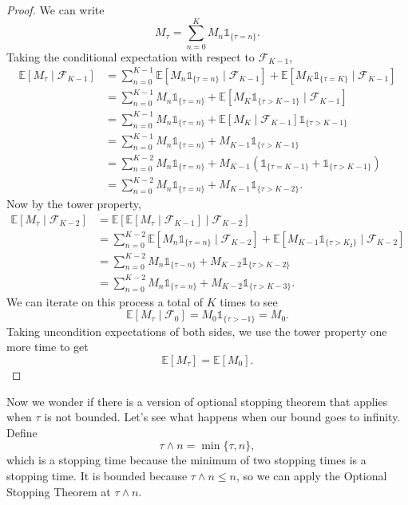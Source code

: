 \documentclass{tufte-handout}
\newcommand*\E{\mathbb{E}}
\theoremstyle{definition}
\begin{document}
\begin{proof}
	We can write \[
		M_\tau = \sum\limits_{n=0}^{K} M_n \mathds{1}_{\{\tau=n\}}
	.\] Taking the conditional expectation with respect to $\mathscr{F}_{K-1}$,
	\begin{align*}
		\E\left[M_\tau \mid \mathscr{F}_{K-1}\right] &= \sum\limits_{n=0}^{K-1} \E\left[M_n \mathds{1}_{\{\tau = n\}} \mid \mathscr{F}_{K-1}\right] + \E\left[M_K \mathds{1}_{\{\tau = K\}} \mid \mathscr{F}_{K-1}\right]  \\
		&= \sum\limits_{n=0}^{K-1} M_n \mathds{1}_{\{\tau=n\}} + \E\left[M_K \mathds{1}_{\{\tau > K-1\}} \mid \mathscr{F}_{K-1}\right]  \\
		&= \sum\limits_{n=0}^{K-1} M_n \mathds{1}_{\{\tau=n\}} + \E\left[M_K \mid \mathscr{F}_{K-1}\right] \mathds{1}_{\{\tau > K-1\}} \\
		&= \sum\limits_{n=0}^{K-1} M_n \mathds{1}_{\{\tau=n\}} + M_{K-1} \mathds{1}_{\{\tau > K-1\}} \\
		&= \sum\limits_{n=0}^{K-2}  M_n \mathds{1}_{\{\tau = n\}} + M_{K-1} \left( \mathds{1}_{\{\tau = K-1\}} + \mathds{1}_{\{\tau > K-1\}} \right) \\
		&= \sum\limits_{n=0}^{K-2} M_n \mathds{1}_{\{\tau = n\}} + M_{K-1} \mathds{1}_{\{\tau > K-2\}}
	.\end{align*}
	Now by the tower property,
	\begin{align*}
		\E\left[M_\tau \mid \mathscr{F}_{K-2}\right] &= \E\left[\E\left[M_\tau \mid \mathscr{F}_{K-1}\right] \mid \mathscr{F}_{K-2}\right]  \\
													 &= \sum\limits_{n=0}^{K-2} \E\left[M_n \mathds{1}_{\{\tau = n\}} \mid \mathscr{F}_{K-2}\right] + \E\left[M_{K-1}  \mathds{1}_{\{\tau > K_2\}} \mid \mathscr{F}_{K-2} \right] \\
													 &= \sum\limits_{n=0}^{K-2} M_n \mathds{1}_{\{\tau - n\}} + M_{K-2}\mathds{1}_{\{\tau > K-2\}} \\
													 &= \sum\limits_{n=0}^{K-2} M_n \mathds{1}_{\{\tau = n\}} + M_{K-2} \mathds{1}_{\{\tau > K-3\}}
	.\end{align*}
	We can iterate on this process a total of $K$ times to see \[
		\E\left[M_\tau \mid \mathscr{F}_0\right] = M_0 \mathds{1}_{\{\tau > -1\}} = M_0
	.\] 
	Taking uncondition expectations of both sides, we use the tower property one more time to get \[
		\E\left[M_\tau\right] = \E\left[M_0\right] 
	.\] 
\end{proof}

Now we wonder if there is a version of optional stopping theorem that applies when $\tau$ is not bounded. Let's see what happens when our bound goes to infinity. Define \[
	\tau \wedge n = \min \{\tau,n\}
,\] which is a stopping time because the minimum of two stopping times is a stopping time. It is bounded because $\tau \wedge n \le n$, so we can apply the Optional Stopping Theorem at $\tau \wedge n$.
\end{document}
